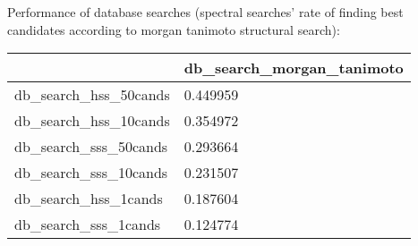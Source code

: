 Performance of database searches (spectral searches' rate of finding best candidates according to morgan tanimoto structural search):
\begin{tabular}{ll}
\toprule
 & db_search_morgan_tanimoto \\
\midrule
db_search_hss_50cands & 0.449959 \\
db_search_hss_10cands & 0.354972 \\
db_search_sss_50cands & 0.293664 \\
db_search_sss_10cands & 0.231507 \\
db_search_hss_1cands & 0.187604 \\
db_search_sss_1cands & 0.124774 \\
\bottomrule
\end{tabular}
